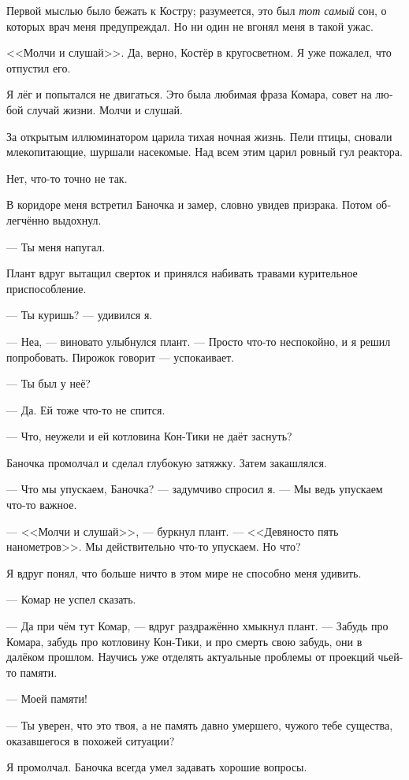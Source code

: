 \documentclass[a4paper,12pt,fleqn]{book}\usepackage{polyglossia}\setdefaultlanguage[babelshorthands=true]{russian}\setotherlanguage{english}\defaultfontfeatures{Ligatures=TeX,Mapping=tex-text}\usepackage{xcolor}\newcommand{\ml}[3]{#2}
\begin{document}
{Первой мыслью было бежать к Костру;
разумеется, это был \emph{тот самый} сон, о которых врач меня предупреждал.
Но ни один не вгонял меня в такой ужас.

<<Молчи и слушай>>.
Да, верно, Костёр в кругосветном.
Я уже пожалел, что отпустил его.

Я лёг и попытался не двигаться.
Это была любимая фраза Комара, совет на любой случай жизни.
Молчи и слушай.

За открытым иллюминатором царила тихая ночная жизнь.
Пели птицы, сновали млекопитающие, шуршали насекомые.
Над всем этим царил ровный гул реактора.

Нет, что-то точно не так.

В коридоре меня встретил Баночка и замер, словно увидев призрака.
Потом облегчённо выдохнул.

--- Ты меня напугал.

Плант вдруг вытащил сверток и принялся набивать травами курительное приспособление.

--- Ты куришь? --- удивился я.

--- Неа, --- виновато улыбнулся плант.
--- Просто что-то неспокойно, и я решил попробовать.
Пирожок говорит --- успокаивает.

--- Ты был у неё?

--- Да.
Ей тоже что-то не спится.

--- Что, неужели и ей котловина Кон-Тики не даёт заснуть?

Баночка промолчал и сделал глубокую затяжку.
Затем закашлялся.

--- Что мы упускаем, Баночка? --- задумчиво спросил я.
--- Мы ведь упускаем что-то важное.

--- <<Молчи и слушай>>, --- буркнул плант.
--- <<Девяносто пять нанометров>>.
Мы действительно что-то упускаем.
Но что?

Я вдруг понял, что больше ничто в этом мире не способно меня удивить.

--- Комар не успел сказать.

--- Да при чём тут Комар, --- вдруг раздражённо хмыкнул плант.
--- Забудь про Комара, забудь про котловину Кон-Тики, и про смерть свою забудь, они в далёком прошлом.
Научись уже отделять актуальные проблемы от проекций чьей-то памяти.

--- Моей памяти!

--- Ты уверен, что это твоя, а не память давно умершего, чужого тебе существа, оказавшегося в похожей ситуации?

Я промолчал.
Баночка всегда умел задавать хорошие вопросы.

}
\end{document}

